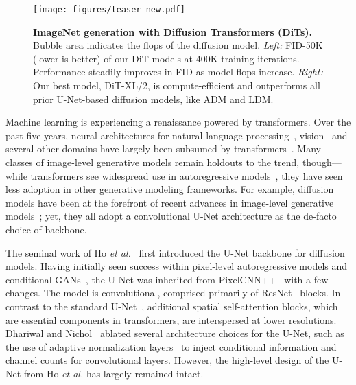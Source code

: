 \documentclass[10pt,twocolumn,letterpaper]{article}
\makeatletter
\def\etal{\emph{et al.}\@\xspace}
\makeatother
\begin{document}

\begin{figure*}[t]
\texttt{[image: figures/teaser\_new.pdf]}
\vspace{-4mm}
\caption{\textbf{ImageNet generation with Diffusion Transformers (DiTs).} Bubble area indicates the flops of the diffusion model. \emph{Left:} FID-50K (lower is better) of our DiT models at 400K training iterations. Performance steadily improves in FID as model flops increase. \emph{Right:} Our best model, DiT-XL/2, is compute-efficient and outperforms all prior U-Net-based diffusion models, like ADM and LDM.}
\label{fig:bubbles}
\end{figure*}
\vspace{-4mm}
Machine learning is experiencing a renaissance powered by transformers. Over the past five years, neural architectures for natural language processing~\cite{Radford2018,Devlin2019}, vision~\cite{Dosovitskiy2020} and several other domains have largely been subsumed by transformers~\cite{Vaswani2017}. 
Many classes of image-level generative models remain holdouts to the trend, though---while transformers see widespread use in autoregressive models~\cite{Radford2019,Brown2020,Chen2020generative,ramesh2021zero}, they have seen less adoption in other generative modeling frameworks. 
For example, diffusion models have been at the forefront of recent advances in image-level generative models~\cite{dhariwal2021adm,ramesh2022hierarchical}; yet, they all adopt a convolutional U-Net architecture as the de-facto choice of backbone. 

The seminal work of Ho \etal~\cite{ho2020ddpm} first introduced the U-Net backbone for diffusion models. Having initially seen success within pixel-level autoregressive models and conditional GANs~\cite{isola2017image}, the U-Net was inherited from PixelCNN++~\cite{salimans2017pixelcnn++,van2016conditional} with a few changes. The model is convolutional, comprised primarily of ResNet~\cite{He2016} blocks. In contrast to the standard U-Net~\cite{ronneberger2015u}, additional spatial self-attention blocks, which are essential components in transformers, are interspersed at lower resolutions. Dhariwal and Nichol~\cite{dhariwal2021adm} ablated several architecture choices for the U-Net, such as the use of adaptive normalization layers~\cite{perez2018film} to inject conditional information and channel counts for convolutional layers. However, the high-level design of the U-Net from Ho \etal has largely remained intact.
\end{document}
